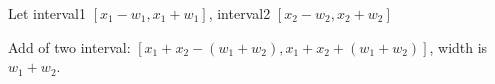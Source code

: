 \documentclass{scrreprt}
\begin{document}
Let interval1 $[x_1-w_1,x_1+w_1]$, interval2 $[x_2-w_2,x_2+w_2]$

Add of two interval: $[x_1+x_2-(w_1+w_2),x_1+x_2+(w_1+w_2)]$, width is $w_1+w_2$.
\end{document}
